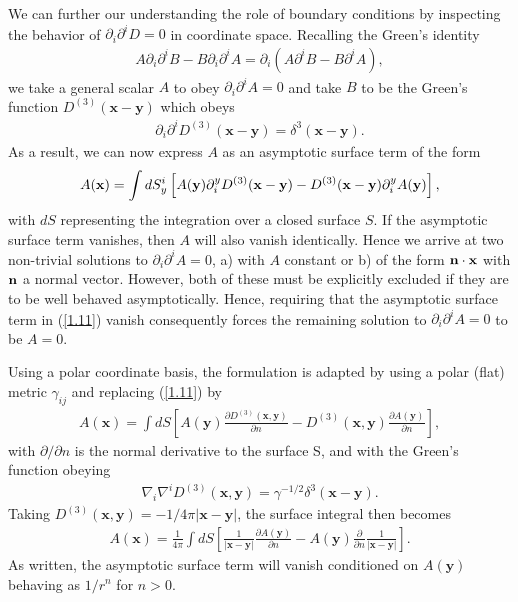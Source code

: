 We can further our understanding the role of boundary conditions by inspecting the behavior of $\partial_i\partial^iD=0$ in coordinate space. Recalling the Green's identity
%
\begin{eqnarray}
A \partial_i\partial^iB-B \partial_i\partial^iA=\partial_i(A\partial^iB-B\partial^iA),
\label{1.9}
\end{eqnarray}
%
we take a general scalar $A$ to obey $\partial_i\partial^iA=0$ and take $B$ to be the Green's function $D^{(3)}(\mathbf{x}-\mathbf{y})$ which obeys
%
\begin{eqnarray}
\partial_i\partial^iD^{(3)}(\mathbf{x}-\mathbf{y})=\delta^3(\mathbf{x}-\mathbf{y}).
\label{1.10}
\end{eqnarray}
%
As a result, we can now express $A$ as an asymptotic surface term of the form 
%
\begin{eqnarray}
A({\bf x}) =\int dS_y^i\left[A({\bf y})\partial^y_iD^{(3)}(\mathbf{x}-\mathbf{y})-D^{(3)}(\mathbf{x}-\mathbf{y})\partial^y_iA({\bf y})\right],
\label{1.11}
\end{eqnarray}
%
with $dS$ representing the integration over a closed surface $S$. If the asymptotic surface term vanishes, then $A$ will also vanish identically. Hence we arrive at two non-trivial solutions to $\partial_i\partial^iA=0$, a) with $A$ constant or b) of the form ${\bf n}\cdot {\bf x}$ with ${\bf n}$ a normal vector. However, both of these must be explicitly excluded if they are to be well behaved asymptotically. Hence, requiring that the asymptotic surface term in (\ref{1.11}) vanish consequently forces the remaining solution to $\partial_i\partial^iA=0$ to be $A=0$.

Using a polar coordinate basis, the formulation is adapted by using a polar (flat) metric $\gamma_{ij}$ and replacing (\ref{1.11}) by
%
\begin{eqnarray}
A(\textbf{x})=\int dS\left[A(\mathbf{y})\frac{\partial D^{(3)}(\mathbf{x},\mathbf{y})}{\partial  n} -D^{(3)}(\mathbf{x},\mathbf{y})\frac{\partial A(\mathbf{y})}{\partial n}\right],
\label{1.12a}
\end{eqnarray}
%
with $\partial/\partial n$ is the normal derivative to the surface S, and with the Green's function obeying
%
\begin{eqnarray}
\nabla_i\nabla^iD^{(3)}(\mathbf{x},\mathbf{y})=\gamma^{-1/2}\delta^3(\mathbf{x}-\mathbf{y}).
\label{1.13a}
\end{eqnarray}
%
Taking $D^{(3)}(\mathbf{x},\mathbf{y})=-1/4\pi|\mathbf{x}-\mathbf{y}|$, the surface integral then becomes
%
\begin{eqnarray}
A(\textbf{x})=\frac{1}{4\pi} \int dS\left[\frac{1}{|\mathbf{x}-\mathbf{y}|}\frac{\partial A(\mathbf{y})}{\partial n}-
A(\mathbf{y})\frac{\partial}{\partial  n}\frac{1}{|\mathbf{x}-\mathbf{y}|}\right].
\label{1.14a}
\end{eqnarray}
%
As written, the asymptotic surface term will vanish conditioned on $A(\mathbf{y})$ behaving as $1/r^{n}$ for $n>0$. 

